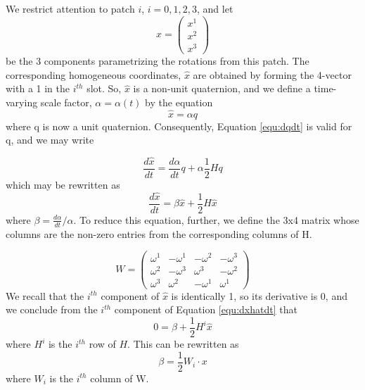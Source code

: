 \documentclass{gen-j-l}
\theoremstyle{definition}
\theoremstyle{remark}
\numberwithin{equation}{section}
\begin{document}
We restrict attention to patch $i$, $i = 0, 1, 2, 3$, and let
\[
x = \left(
\begin{array}{c}
x^1 \\
x^2 \\
x^3
\end{array}
\right)
\]
be the 3 components parametrizing the rotations from this patch.  The corresponding
homogeneous coordinates, $\hat{x}$ are obtained by forming the 4-vector with a 1
in the $i^{th}$ slot.  So, $\hat{x}$ is a non-unit quaternion, and we define a time-varying
scale factor, $\alpha = \alpha(t) $ by the equation
\begin{equation*}
 \hat{x} = \alpha q
\end{equation*}
where q is now a unit quaternion.  Consequently, Equation \ref{equ:dqdt} 
is valid for q, and we may write

\begin{equation*}
\frac{d \hat{x}}{dt} = \frac{d \alpha}{dt} q + \alpha \frac{1}{2} H q
\end{equation*}
which may be rewritten as
\begin{equation}
\label{equ:dxhatdt}
\frac{d \hat{x}}{dt} = \beta \hat{x} + \frac{1}{2} H \hat{x}
\end{equation}
where $ \beta = \frac{d \alpha}{dt} / \alpha $.  To reduce this equation, further,
we define the 3x4 matrix whose columns are the non-zero entries from the
corresponding columns of H.

\begin{equation}
W = \left(
\begin{array}{cccc}
\omega^1  &    -\omega^1   &   -\omega^2  &    -\omega^3   \\
\omega^2  &  -\omega^3    & \omega^3    & -\omega^2         \\
\omega^3  &   \omega^2   &   -\omega^1  & \omega^1      
\end{array}
\right)
\end{equation}
We recall that the $i^{th}$ component of $\hat{x}$ is identically 1, so its derivative is 0,
and we conclude from the $i^{th}$ component of Equation \ref{equ:dxhatdt} that 
\begin{equation*}
0 = \beta + \frac{1}{2} H^i \hat{x}
\end{equation*}
where $H^i$ is the $i^{th}$ row of $H$.  This can be rewritten as
\begin{equation}
\label{equ:beta}
\beta = \frac{1}{2} W_i \cdot x
\end{equation}
where $W_i$ is the $i^{th}$ column of W.
\end{document}
